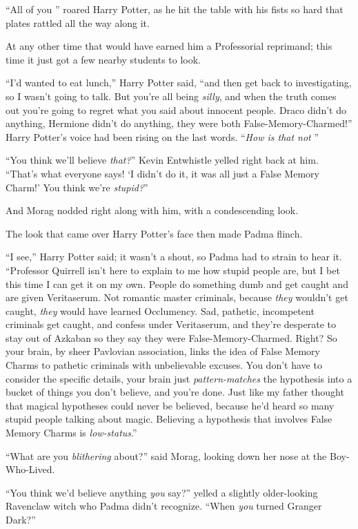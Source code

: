 “All of you ” roared Harry Potter, as he hit the table with his fists so hard that plates rattled all the way along it.

At any other time that would have earned him a Professorial reprimand; this time it just got a few nearby students to look.

“I’d wanted to eat lunch,” Harry Potter said, “and then get back to investigating, so I wasn’t going to talk. But you’re all being \emph{silly}, and when the truth comes out you’re going to regret what you said about innocent people. Draco didn’t do anything, Hermione didn’t do anything, they were both False-Memory-Charmed!” Harry Potter’s voice had been rising on the last words. “\emph{How is that not }”

“You think we’ll believe \emph{that?}” Kevin Entwhistle yelled right back at him. “That’s what everyone says! ‘I didn’t do it, it was all just a False Memory Charm!’ You think we’re \emph{stupid?}”

And Morag nodded right along with him, with a condescending look.

The look that came over Harry Potter’s face then made Padma flinch.

“I see,” Harry Potter said; it wasn’t a shout, so Padma had to strain to hear it. “Professor Quirrell isn’t here to explain to me how stupid people are, but I bet this time I can get it on my own. People do something dumb and get caught and are given Veritaserum. Not romantic master criminals, because \emph{they} wouldn’t get caught, \emph{they} would have learned Occlumency. Sad, pathetic, incompetent criminals get caught, and confess under Veritaserum, and they’re desperate to stay out of Azkaban so they say they were False-Memory-Charmed. Right? So your brain, by sheer Pavlovian association, links the idea of False Memory Charms to pathetic criminals with unbelievable excuses. You don’t have to consider the specific details, your brain just \emph{pattern-matches} the hypothesis into a bucket of things you don’t believe, and you’re done. Just like my father thought that magical hypotheses could never be believed, because he’d heard so many stupid people talking about magic. Believing a hypothesis that involves False Memory Charms is \emph{low-status}.”

“What are you \emph{blithering} about?” said Morag, looking down her nose at the Boy-Who-Lived.

“You think we’d believe anything \emph{you} say?” yelled a slightly older-looking Ravenclaw witch who Padma didn’t recognize. “When \emph{you} turned Granger Dark?”

